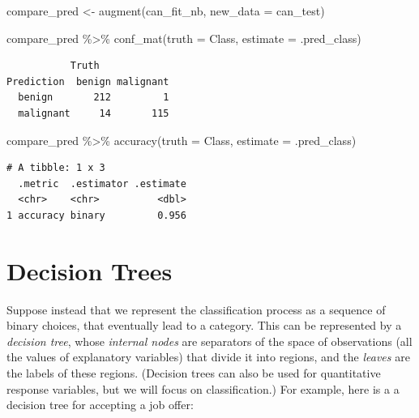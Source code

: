 \documentclass[
  letterpaper,
  DIV=11,
  numbers=noendperiod]{scrreprt}
\newenvironment{Shaded}{\begin{snugshade}}{\end{snugshade}}
\newcommand{\AttributeTok}[1]{\textcolor[rgb]{0.40,0.45,0.13}{#1}}
\newcommand{\FunctionTok}[1]{\textcolor[rgb]{0.28,0.35,0.67}{#1}}
\newcommand{\NormalTok}[1]{\textcolor[rgb]{0.00,0.23,0.31}{#1}}
\newcommand{\OtherTok}[1]{\textcolor[rgb]{0.00,0.23,0.31}{#1}}
\newcommand{\SpecialCharTok}[1]{\textcolor[rgb]{0.37,0.37,0.37}{#1}}
\begin{document}
\begin{Shaded}
\begin{Highlighting}[]
\NormalTok{compare\_pred }\OtherTok{\textless{}{-}} \FunctionTok{augment}\NormalTok{(can\_fit\_nb, }\AttributeTok{new\_data =}\NormalTok{ can\_test) }

\NormalTok{compare\_pred }\SpecialCharTok{\%\textgreater{}\%} \FunctionTok{conf\_mat}\NormalTok{(}\AttributeTok{truth =}\NormalTok{ Class, }\AttributeTok{estimate =}\NormalTok{ .pred\_class)}
\end{Highlighting}
\end{Shaded}

\begin{verbatim}
           Truth
Prediction  benign malignant
  benign       212         1
  malignant     14       115
\end{verbatim}

\begin{Shaded}
\begin{Highlighting}[]
\NormalTok{compare\_pred }\SpecialCharTok{\%\textgreater{}\%}  \FunctionTok{accuracy}\NormalTok{(}\AttributeTok{truth =}\NormalTok{ Class, }\AttributeTok{estimate =}\NormalTok{ .pred\_class)}
\end{Highlighting}
\end{Shaded}

\begin{verbatim}
# A tibble: 1 x 3
  .metric  .estimator .estimate
  <chr>    <chr>          <dbl>
1 accuracy binary         0.956
\end{verbatim}

\hypertarget{decision-trees}{%
\section{Decision Trees}\label{decision-trees}}

Suppose instead that we represent the classification process as a
sequence of binary choices, that eventually lead to a category. This can
be represented by a \emph{decision tree}, whose \emph{internal nodes}
are separators of the space of observations (all the values of
explanatory variables) that divide it into regions, and the
\emph{leaves} are the labels of these regions. (Decision trees can also
be used for quantitative response variables, but we will focus on
classification.) For example, here is a a decision tree for accepting a
job offer:
\end{document}
